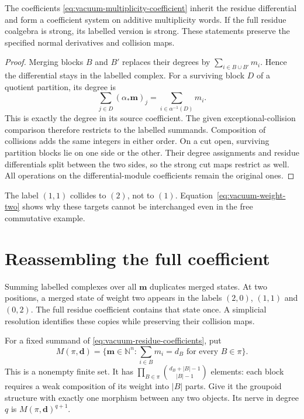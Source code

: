 \begin{proposition}
\label{prop:vacuum-multiplicity}
The coefficients \eqref{eq:vacuum-multiplicity-coefficient} inherit
the residue differential and form a coefficient system on additive
multiplicity words.  If the full residue coalgebra is strong, its
labelled version is strong.  These statements preserve the specified
normal derivatives and collision maps.
\end{proposition}
\begin{proof}
Merging blocks \(B\) and \(B'\) replaces their degrees by
\(\sum_{i\in B\cup B'}m_i\).  Hence the differential stays in the
labelled complex.  For a surviving block \(D\) of a quotient
partition, its degree is
\[
 \sum_{j\in D}(\alpha_*\mathbf m)_j
   =\sum_{i\in\alpha^{-1}(D)}m_i.
\]
This is exactly the degree in its source coefficient.  The given
exceptional-collision comparison therefore restricts to the labelled
summands.  Composition of collisions adds the same integers in
either order.  On a cut open, surviving partition blocks lie on
one side or the other.  Their degree assignments and residue
differentials split between the two sides, so the strong cut maps
restrict as well.  All operations on the differential-module
coefficients remain the original ones.
\end{proof}

The label \((1,1)\) collides to \((2)\), not to \((1)\).
Equation~\eqref{eq:vacuum-weight-two} shows why these targets cannot
be interchanged even in the free commutative example.

\section{Reassembling the full coefficient}

Summing labelled complexes over all \(\mathbf m\) duplicates merged
states.  At two positions, a merged state of weight two appears in
the labels \((2,0)\), \((1,1)\) and \((0,2)\).  The full residue
coefficient contains that state once.  A simplicial resolution
identifies these copies while preserving their collision maps.

For a fixed summand of \eqref{eq:vacuum-residue-coefficients}, put
\[
 M(\pi,\mathbf d)=
 \{\mathbf m\in\mathbb N^n:
           \sum_{i\in B}m_i=d_B\text{ for every }B\in\pi\}.
\]
This is a nonempty finite set.  It has
\(\prod_{B\in\pi}\binom{d_B+|B|-1}{|B|-1}\) elements: each block
requires a weak composition of its weight into \(|B|\) parts.
Give it the groupoid structure with exactly one morphism between
any two objects.  Its nerve in degree \(q\) is
\(M(\pi,\mathbf d)^{q+1}\).

